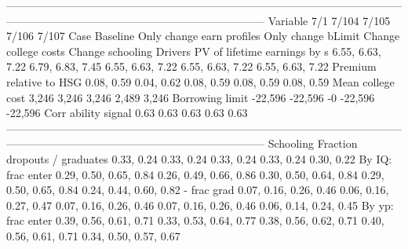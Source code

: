 -----------------------------------------------------------------------------------------------------------------------------------------------------------------------------------
                              Variable                          7/1                        7/104                    7/105                        7/106                        7/107
                                  Case                     Baseline    Only change earn profiles       Only change bLimit         Change college costs             Change schooling
                               Drivers                                                                                                                                             
          PV of lifetime earnings by s             6.55, 6.63, 7.22             6.79, 6.83, 7.45         6.55, 6.63, 7.22             6.55, 6.63, 7.22             6.55, 6.63, 7.22
               Premium relative to HSG                   0.08, 0.59                   0.04, 0.62               0.08, 0.59                   0.08, 0.59                   0.08, 0.59
                     Mean college cost                        3,246                        3,246                    3,246                        2,489                        3,246
                       Borrowing limit                      -22,596                      -22,596                       -0                      -22,596                      -22,596
                   Corr ability signal                         0.63                         0.63                     0.63                         0.63                         0.63
-----------------------------------------------------------------------------------------------------------------------------------------------------------------------------------
                             Schooling                                                                                                                                             
         Fraction dropouts / graduates                   0.33, 0.24                   0.33, 0.24               0.33, 0.24                   0.33, 0.24                   0.30, 0.22
                     By IQ: frac enter       0.29, 0.50, 0.65, 0.84       0.26, 0.49, 0.66, 0.86   0.30, 0.50, 0.64, 0.84       0.29, 0.50, 0.65, 0.84       0.24, 0.44, 0.60, 0.82
                           - frac grad       0.07, 0.16, 0.26, 0.46       0.06, 0.16, 0.27, 0.47   0.07, 0.16, 0.26, 0.46       0.07, 0.16, 0.26, 0.46       0.06, 0.14, 0.24, 0.45
                     By yp: frac enter       0.39, 0.56, 0.61, 0.71       0.33, 0.53, 0.64, 0.77   0.38, 0.56, 0.62, 0.71       0.40, 0.56, 0.61, 0.71       0.34, 0.50, 0.57, 0.67
